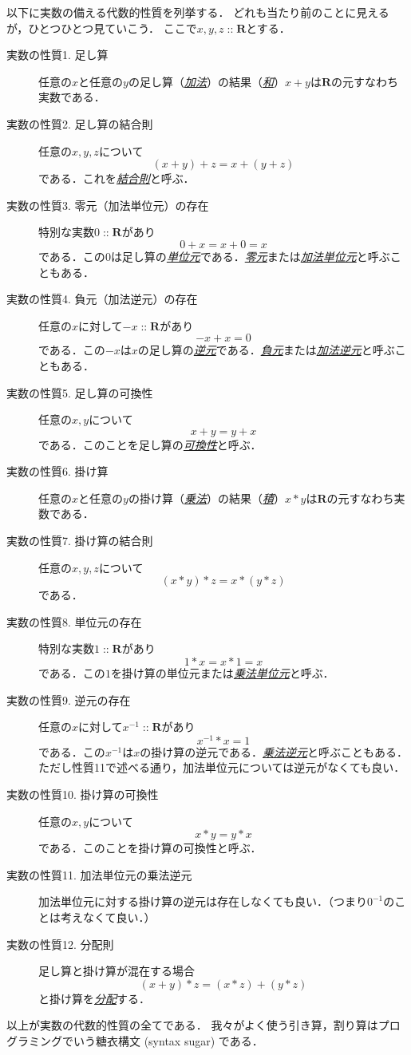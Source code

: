 \documentclass[twocolumn]{jsbook}
\newcommand{\keyword}[1]{\underline{\emph{#1}}}
\DeclareMathOperator{\mathIn}{::}
\newcommand{\mathSet}[1]{\mathbf{#1}}
\begin{document}
以下に実数の備える代数的性質を列挙する．
どれも当たり前のことに見えるが，ひとつひとつ見ていこう．
ここで$x,y,z\mathIn\mathSet{R}$とする．
\begin{description}
\item[実数の性質1. 足し算] 任意の$x$と任意の$y$の足し算（\keyword{加法}）の結果（\keyword{和}）$x+y$は$\mathSet{R}$の元すなわち実数である．
\item[実数の性質2. 足し算の結合則] 任意の$x,y,z$について$$(x+y)+z=x+(y+z)$$である．これを\keyword{結合則}と呼ぶ．
\item[実数の性質3. 零元（加法単位元）の存在] 特別な実数$0\mathIn\mathSet{R}$があり$$0+x=x+0=x$$である．この$0$は足し算の\keyword{単位元}である．\keyword{零元}または\keyword{加法単位元}と呼ぶこともある．
\item[実数の性質4. 負元（加法逆元）の存在] 任意の$x$に対して$-x\mathIn\mathSet{R}$があり$$-x+x=0$$である．この$-x$は$x$の足し算の\keyword{逆元}である．\keyword{負元}または\keyword{加法逆元}と呼ぶこともある．
\item[実数の性質5. 足し算の可換性] 任意の$x,y$について$$x+y=y+x$$である．このことを足し算の\keyword{可換性}と呼ぶ．
\item[実数の性質6. 掛け算] 任意の$x$と任意の$y$の掛け算（\keyword{乗法}）の結果（\keyword{積}）$x*y$は$\mathSet{R}$の元すなわち実数である．
\item[実数の性質7. 掛け算の結合則] 任意の$x,y,z$について$$(x*y)*z=x*(y*z)$$である．
\item[実数の性質8. 単位元の存在] 特別な実数$1\mathIn\mathSet{R}$があり$$1*x=x*1=x$$である．この$1$を掛け算の単位元または\keyword{乗法単位元}と呼ぶ．
\item[実数の性質9. 逆元の存在] 任意の$x$に対して$x^{-1}\mathIn\mathSet{R}$があり$$x^{-1}*x=1$$である．この$x^{-1}$は$x$の掛け算の逆元である．\keyword{乗法逆元}と呼ぶこともある．ただし性質11で述べる通り，加法単位元については逆元がなくても良い．
\item[実数の性質10. 掛け算の可換性] 任意の$x,y$について$$x*y=y*x$$である．このことを掛け算の可換性と呼ぶ．
\item[実数の性質11. 加法単位元の乗法逆元] 加法単位元に対する掛け算の逆元は存在しなくても良い．（つまり$0^{-1}$のことは考えなくて良い．）
\item[実数の性質12. 分配則] 足し算と掛け算が混在する場合$$(x+y)*z=(x*z)+(y*z)$$と掛け算を\keyword{分配}する．
\end{description}
以上が実数の代数的性質の全てである．
我々がよく使う引き算，割り算はプログラミングでいう糖衣構文 (syntax sugar) である．
\end{document}
